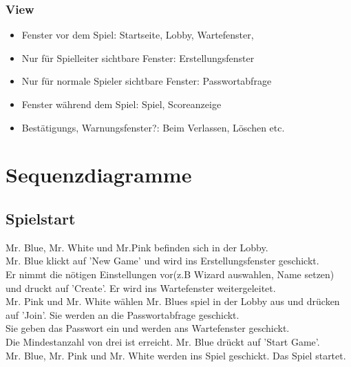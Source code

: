 \documentclass{article}
\begin{document}
	\subsubsection{View}
		\begin{itemize}
			\item{Fenster vor dem Spiel}: Startseite, Lobby, Wartefenster, 
			\item{Nur für Spielleiter sichtbare Fenster}: Erstellungsfenster
			\item{Nur für normale Spieler sichtbare Fenster}: Passwortabfrage
			\item{Fenster während dem Spiel}: Spiel, Scoreanzeige
			\item{Bestätigungs, Warnungsfenster?}: Beim Verlassen, Löschen etc.
		\end{itemize}


\section{Sequenzdiagramme}
	\subsection{Spielstart}
		Mr. Blue, Mr. White und Mr.Pink befinden sich in der Lobby. \\
		Mr. Blue klickt auf 'New Game' und wird ins Erstellungsfenster geschickt. \\
		Er nimmt die nötigen Einstellungen vor(z.B Wizard auswahlen, Name setzen) und druckt auf 'Create'. Er wird ins  Wartefenster weitergeleitet.\\
		Mr. Pink und Mr. White wählen Mr. Blues spiel in der Lobby aus und drücken auf 'Join'. Sie werden an die Passwortabfrage geschickt.\\
		Sie geben das Passwort ein und werden ans Wartefenster geschickt.\\
		Die Mindestanzahl von drei ist erreicht. Mr. Blue drückt auf 'Start Game'.\\
		Mr. Blue, Mr. Pink und Mr. White werden ins Spiel geschickt. Das Spiel startet.\\
\end{document}
